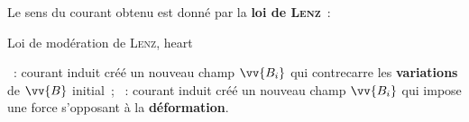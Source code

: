 \documentclass[../main/main.tex]{subfiles}
\begin{document}
Le sens du courant obtenu est donné par la \textbf{loi de \textsc{Lenz}}~:
\begin{tprop}{Loi de modération de \textsc{Lenz}, heart}
  \begin{center}
  \end{center}
\end{tprop}

\begin{itemize}[label=$\diamond$, leftmargin=10pt]
  ~: courant induit créé un nouveau champ $\vv{B_i}$ qui
  contrecarre les \textbf{variations} de $\vv{B}$ initial~;
  ~: courant induit créé un nouveau champ $\vv{B_i}$ qui
  impose une force s'opposant à la \textbf{déformation}.
\end{itemize}
\end{document}
